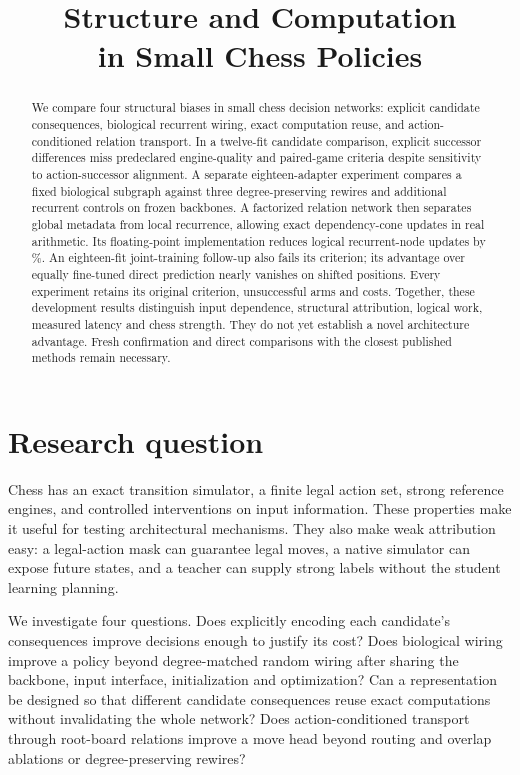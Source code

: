 \documentclass{article}
\title{Structure and Computation\\in Small Chess Policies}
\begin{document}
\maketitle

\begin{abstract}
We compare four structural biases in small chess decision networks: explicit
candidate consequences, biological recurrent wiring, exact computation reuse,
and action-conditioned relation transport. In a twelve-fit candidate comparison,
explicit successor differences miss predeclared engine-quality and paired-game
criteria despite sensitivity to action-successor alignment. A separate
eighteen-adapter experiment compares a fixed biological subgraph against three
degree-preserving rewires and additional recurrent controls on frozen backbones.
\BioAbstract{} A factorized relation network then separates global metadata
from local recurrence, allowing exact dependency-cone updates in real arithmetic.
Its floating-point implementation reduces logical recurrent-node updates by
\LocalSavings\%. \BatchAbstract{} \TransportAbstract{}
An eighteen-fit joint-training follow-up also fails its criterion; its advantage
over equally fine-tuned direct prediction nearly vanishes on shifted positions.
Every experiment retains its original criterion, unsuccessful arms and costs.
Together, these development results distinguish input dependence, structural
attribution, logical work, measured latency and chess strength. They do not yet
establish a novel architecture advantage. Fresh confirmation and direct
comparisons with the closest published methods remain necessary.
\end{abstract}

\section{Research question}
Chess has an exact transition simulator, a finite legal action set, strong
reference engines, and controlled interventions on input information. These
properties make it useful for testing architectural mechanisms. They also make
weak attribution easy: a legal-action mask can guarantee legal moves, a native
simulator can expose future states, and a teacher can supply strong labels
without the student learning planning.

We investigate four questions. Does explicitly encoding each candidate's
consequences improve decisions enough to justify its cost? Does biological
wiring improve a policy beyond degree-matched random wiring after sharing the
backbone, input interface, initialization and optimization? Can a representation
be designed so that different candidate consequences reuse exact computations
without invalidating the whole network? Does action-conditioned transport
through root-board relations improve a move head beyond routing and overlap
ablations or degree-preserving rewires?
\end{document}
